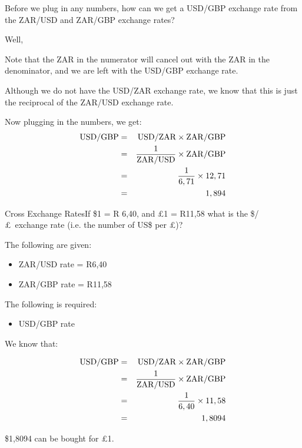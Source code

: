 \documentclass[10pt,a4paper,titlepage,twoside,openright]{report}
\begin{document}
Before we plug in any numbers, how can we get a USD/GBP exchange rate from the ZAR/USD and ZAR/GBP exchange rates?

Well,

Note that the ZAR in the numerator will cancel out with the ZAR in the denominator, and we are left with the USD/GBP exchange rate.

Although we do not have the USD/ZAR exchange rate, we know that this is just the reciprocal of the ZAR/USD exchange rate.

Now plugging in the numbers, we get:
\begin{eqnarray*}
\rm{USD/GBP} &=&\rm{USD/ZAR} \times \rm{ZAR/GBP}\\
&=& \rm{\frac{1}{ZAR/USD}}  \times \rm{ZAR/GBP}\\
&=& \frac{1}{6,71} \times 12,71\\
&=& 1,894
\end{eqnarray*}


\begin{wex}{Cross Exchange Rates}{If \$1 = R 6,40, and \pounds 1 = R11,58 what is the \$/\pounds\ exchange rate (i.e. the number of US\$ per \pounds )?}{
The following are given:
\begin{itemize}[topsep=0ex, partopsep=\parskip,itemsep=\parskip]
\item{ZAR/USD rate = R6,40}
\item{ZAR/GBP rate = R11,58}
\end{itemize}
The following is required:
\begin{itemize}[topsep=0ex, partopsep=\parskip,itemsep=\parskip]
\item{USD/GBP rate}
\end{itemize}

We know that:

\begin{eqnarray*}
\rm{USD/GBP} &=&\rm{USD/ZAR} \times \rm{ZAR/GBP}\\
&=& \rm{\frac{1}{ZAR/USD}}  \times \rm{ZAR/GBP}\\
&=& \frac{1}{6,40} \times 11,58\\
&=& 1,8094
\end{eqnarray*}

\$1,8094 can be bought for \pounds 1.}
\end{wex}
\end{document}
